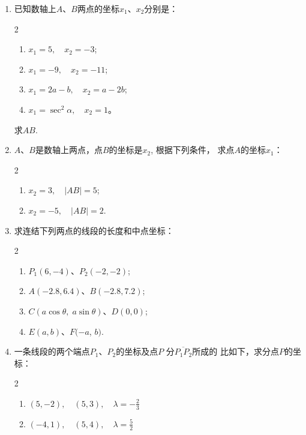 \begin{enumerate}
\item 已知数轴上$A$、$B$两点的坐标$x_1$、$x_2$分别是：
\begin{multicols}{2}
\begin{enumerate}[(1)]
    \item $x_{1}= 5,\quad x_{2}= - 3$;
    \item $x_{1}= - 9,\quad x_{2}= - 11$;
    \item $x_{1}= 2a- b,\quad x_{2}= a- 2b$;
    \item $x_{1}= \sec ^{2}\alpha ,\quad x_{2}= 1$。
\end{enumerate}    
\end{multicols}
求$AB$.
\item $A$、$B$是数轴上两点，点$B$的坐标是$x_2$, 根据下列条件，
求点$A$的坐标$x_1$：
\begin{multicols}{2}
\begin{enumerate}[(1)]
    \item $x_{2}= 3,\quad | AB| = 5$;
    \item $x_{2}= - 5,\quad | AB| = 2$.
\end{enumerate}    
\end{multicols}

\item 求连结下列两点的线段的长度和中点坐标：
\begin{multicols}{2}
\begin{enumerate}[(1)]
    \item $P_{1}( 6, -4)$、$P_{2}( - 2, -2)$;
    \item $A(-2.8,6.4)$、$B(-2.8,7.2)$;
    \item $C(a\cos\theta,\; a\sin\theta)$、$D(0,0)$;
    \item $E( a, b) $、$F( - a$, $b) $.
\end{enumerate}
\end{multicols}
\item 一条线段的两个端点$P_1$、$P_2$的坐标及点$P$ 分$\overline {P_1 P_2}$所成的
比如下，求分点$P$的坐标：
\begin{multicols}{2}
\begin{enumerate}[(1)]
    \item $(5, -2),\quad (5, 3),\quad \lambda = - \frac 23$
    \item $(-4, 1),\quad (5, 4),\quad \lambda = \frac 52$
\end{enumerate}
\end{multicols}
\end{enumerate}

